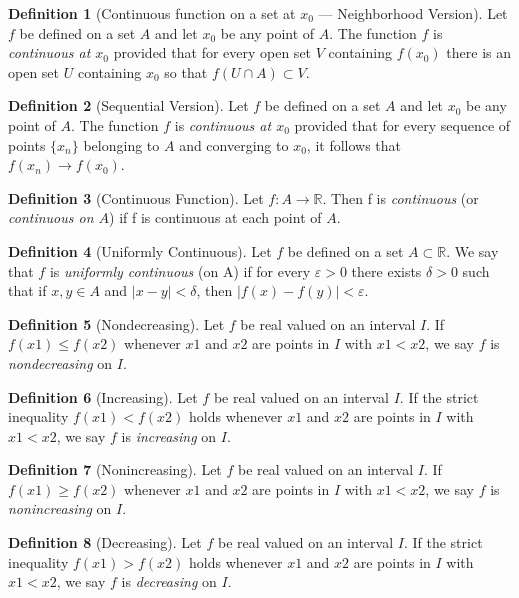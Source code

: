 \documentclass[11pt]{article}
\def \R {\mathbb{R}}
\def \epsilon {\varepsilon}
\newcommand{\set}[1]{\{#1\}}
\def \xn {x_n}
\theoremstyle{definition}
\newtheorem{definition}{Definition}[section]
\begin{document}
\begin{definition} [Continuous function on a set at $ x_0 $ --- Neighborhood Version]
	Let $ f $ be defined on a set $ A $ and let $ x_0 $ be any point of $ A $. The function $ f $ is \textit{continuous at $ x_0 $} provided that for every open set $ V $ containing $ f(x_0) $ there is an open set $ U $ containing $ x_0 $ so that $ f(U \cap A) \subset V $.
\end{definition}


\begin{definition} [Sequential Version]
	Let $ f $ be defined on a set $ A $ and let $ x_0 $ be any point of $ A $. The function $ f $ is \textit{continuous at $ x_0 $} provided that for every sequence of points $ \set{\xn} $ belonging to $ A $ and converging to $ x_0 $, it follows that $ f(\xn) \rightarrow f(x_0) $.
\end{definition}


\begin{definition} [Continuous Function]
	Let $ f : A \rightarrow \R $. Then f is \textit{continuous} (or \textit{continuous on $ A $}) if f is continuous at each point of $ A $.
\end{definition}

\setcounter{definition}{45}
\begin{definition} [Uniformly Continuous]
	Let $ f $ be defined on a set $ A \subset \R $. We say that $ f $ is \textit{uniformly
	continuous} (on A) if for every $ \epsilon > 0 $ there exists $ \delta > 0 $ such that if $ x, y \in A $ and $ |x - y| < \delta $, then $ |f(x) - f(y)| < \epsilon $.
\end{definition}

\setcounter{definition}{55}
\begin{definition} [Nondecreasing]
	Let $ f $ be real valued on an interval $ I $. If $ f(x1) \leq f(x2) $ whenever $ x1 $
	and $ x2 $ are points in $ I $ with $ x1 < x2 $, we say $ f $ is \textit{nondecreasing} on $ I $.
\end{definition}


\begin{definition} [Increasing]
	Let $ f $ be real valued on an interval $ I $. If the strict inequality $ f(x1) < f(x2) $ holds whenever $ x1 $ and $ x2 $ are points in $ I $ with $ x1 < x2 $, we say $ f $ is \textit{increasing} on $ I $.
\end{definition}


\begin{definition} [Nonincreasing]
	Let $ f $ be real valued on an interval $ I $. If $ f(x1) \geq f(x2) $ whenever $ x1 $ and $ x2 $ are points in $ I $ with $ x1 < x2 $, we say $ f $ is \textit{nonincreasing} on $ I $.
\end{definition}


\begin{definition} [Decreasing]
	Let $ f $ be real valued on an interval $ I $. If the strict inequality $ f(x1) > f(x2) $ holds whenever $ x1 $ and $ x2 $ are points in $ I $ with $ x1 < x2 $, we say $ f $ is \textit{decreasing} on $ I $.
\end{definition}
\end{document}
